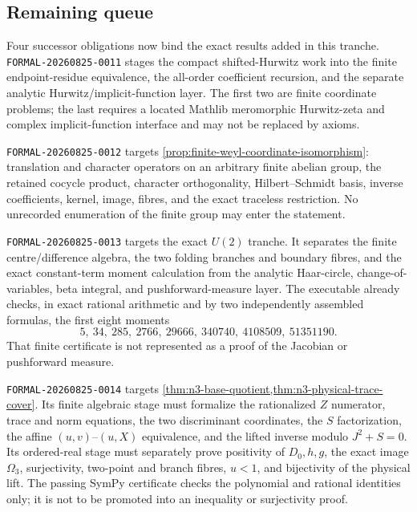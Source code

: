 \subsection{Remaining queue}

Four successor obligations now bind the exact results added in this tranche.
\texttt{FORMAL-20260825-}\allowbreak\texttt{0011} stages the compact shifted-Hurwitz work into the finite
endpoint-residue equivalence, the all-order coefficient recursion, and the separate analytic
Hurwitz/implicit-function layer.  The first two are finite coordinate problems; the last
requires a located Mathlib meromorphic Hurwitz-zeta and complex implicit-function interface
and may not be replaced by axioms.

\texttt{FORMAL-20260825-}\allowbreak\texttt{0012} targets
\cref{prop:finite-weyl-coordinate-isomorphism}: translation and character operators on an
arbitrary finite abelian group, the retained cocycle product, character orthogonality,
Hilbert--Schmidt basis, inverse coefficients, kernel, image, fibres, and the exact traceless
restriction.  No unrecorded enumeration of the finite group may enter the statement.

\texttt{FORMAL-20260825-}\allowbreak\texttt{0013} targets the exact $U(2)$ tranche.  It separates the finite
centre/difference algebra, the two folding branches and boundary fibres, and the exact
constant-term moment calculation from the analytic Haar-circle, change-of-variables, beta
integral, and pushforward-measure layer.  The executable
 already checks, in exact rational
arithmetic and by two independently assembled formulas, the first eight moments
\[
 5,\ 34,\ 285,\ 2766,\ 29666,\ 340740,\ 4108509,\ 51351190.
\]
That finite certificate is not represented as a proof of the Jacobian or pushforward measure.

\texttt{FORMAL-20260825-}\allowbreak\texttt{0014} targets
\cref{thm:n3-base-quotient,thm:n3-physical-trace-cover}.  Its finite algebraic stage must
formalize the rationalized $Z$ numerator, trace and norm equations, the two discriminant
coordinates, the $S$ factorization, the affine $(u,v)$--$(u,X)$ equivalence, and the lifted
inverse modulo $J^2+S=0$.  Its ordered-real stage must separately prove positivity of
$D_0,h,g$, the exact image $\Omega_3$, surjectivity, two-point and branch fibres, $u<1$, and
bijectivity of the physical lift.  The passing SymPy certificate checks the polynomial and
rational identities only; it is not to be promoted into an inequality or surjectivity proof.

